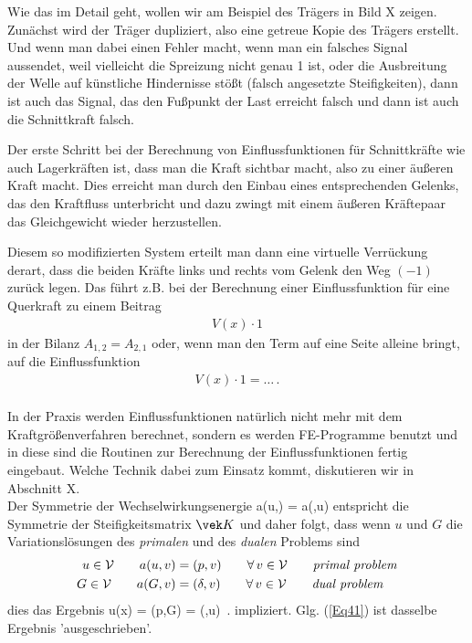 Wie das im Detail geht, wollen wir am Beispiel des Tr\"{a}gers in Bild X zeigen. Zun\"{a}chst wird der Tr\"{a}ger dupliziert, also eine getreue Kopie des Tr\"{a}gers erstellt.\\

Und wenn man dabei einen Fehler macht, wenn man ein falsches Signal aussendet, weil vielleicht die Spreizung nicht genau 1 ist, oder die Ausbreitung der Welle auf k\"{u}nstliche Hindernisse st\"{o}{\ss}t (falsch angesetzte Steifigkeiten), dann ist auch das Signal, das den Fu{\ss}punkt der Last erreicht falsch und dann ist auch die Schnittkraft falsch.



Der erste Schritt bei der Berechnung von Einflussfunktionen f\"{u}r Schnittkr\"{a}fte wie auch Lagerkr\"{a}ften ist, dass man die Kraft sichtbar macht, also zu einer \"{a}u{\ss}eren Kraft macht.
Dies erreicht man durch den Einbau eines entsprechenden Gelenks, das den Kraftfluss unterbricht und dazu zwingt mit einem \"{a}u{\ss}eren Kr\"{a}ftepaar das Gleichgewicht wieder herzustellen.

Diesem so modifizierten System erteilt man dann eine virtuelle Verr\"{u}ckung derart, dass die beiden Kr\"{a}fte links und rechts vom Gelenk den Weg $(-1)$ zur\"{u}ck legen.
Das f\"{u}hrt z.B. bei der Berechnung einer Einflussfunktion f\"{u}r eine Querkraft zu einem Beitrag
\begin{align}
V(x) \cdot 1
\end{align}
in der Bilanz $A_{1,2} = A_{2,1}$ oder, wenn man den Term auf eine Seite alleine bringt, auf die Einflussfunktion
\begin{align}
V(x) \cdot 1 = \ldots\,.
\end{align}\\


In der Praxis werden Einflussfunktionen nat\"{u}rlich nicht mehr mit dem Kraftgr\"{o}{\ss}enverfahren berechnet, sondern es werden FE-Programme benutzt und in diese sind die Routinen zur Berechnung der Einflussfunktionen fertig eingebaut. Welche Technik dabei zum Einsatz kommt, diskutieren wir in Abschnitt X.\\


Der Symmetrie der Wechselwirkungsenergie
\beq
 a(u,)  = a(,u)
\eeq
entspricht die Symmetrie der Steifigkeitsmatrix $\vek K$ und daher folgt, dass wenn $u$ und $G$ die Variationsl\"{o}sungen des {\em primalen\/} und des {\em dualen\/} Problems sind
\begin{align}
u \in \mathcal{V} \qquad a(u,v) &= (p,v) \qquad \forall\,v \in \mathcal{V} \qquad \mbox{{\em primal problem\/}} \\
G \in \mathcal{V} \qquad a(G,v) &= (\delta,v) \qquad \forall\,v \in \mathcal{V} \qquad \mbox{{\em dual problem\/}}
\end{align}
dies das Ergebnis
\beq
u(\vek x) = (p,G) = (\delta,u) \,.
\eeq
impliziert. Glg. (\ref{Eq41}) ist dasselbe Ergebnis 'ausgeschrieben'.



